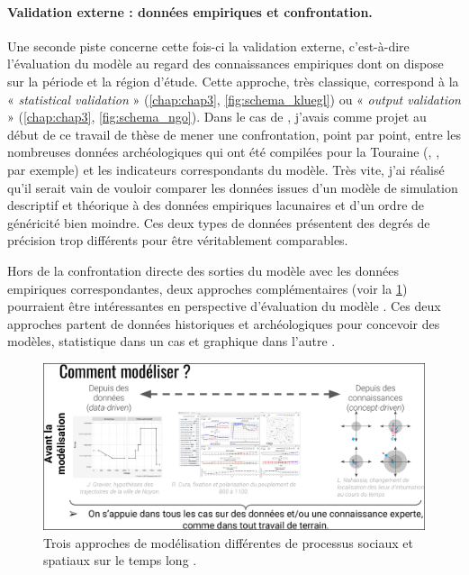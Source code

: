 \paragraph{Validation externe : données empiriques et confrontation.}
Une seconde piste concerne cette fois-ci la validation externe, c'est-à-dire l'évaluation du modèle au regard des connaissances empiriques dont on dispose sur la période et la région d'étude.
Cette approche, très classique, correspond à la « \textit{statistical validation} » (\cref{chap:chap3}, \cref{fig:schema_kluegl}) ou « \textit{output validation} » (\cref{chap:chap3}, \cref{fig:schema_ngo}).
Dans le cas de \simfeodal{}, j'avais comme projet au début de ce travail de thèse de mener une confrontation, point par point, entre les nombreuses données archéologiques qui ont été compilées pour la Touraine (\cite{rodier2000systeme}, \cite{zadora-rio_paroisses_2008}, par exemple) et les indicateurs correspondants du modèle.
Très vite, j'ai réalisé qu'il serait vain de vouloir comparer les données issues d'un modèle de simulation descriptif et théorique à des données empiriques lacunaires et d'un ordre de généricité bien moindre.
Ces deux types de données présentent des degrés de précision trop différents pour être véritablement comparables.

Hors de la confrontation directe des sorties du modèle avec les données empiriques correspondantes, deux approches complémentaires (voir la \cref{fig:JIG}) pourraient être intéressantes en perspective d'évaluation du modèle \simfeodal{}.
Ces deux approches partent de données historiques et archéologiques pour concevoir des modèles, statistique dans un cas \autocite{gravier_deux_2018} et graphique dans l'autre \autocite{nahassia_formes_2019}.

\begin{figure}[H]
	\centering
	\includegraphics[width=\linewidth]{img/types_modelisation_JIG.png}
	\caption[Trois approches de modélisation différentes de processus sociaux et spatiaux sur le temps long.]{Trois approches de modélisation différentes de processus sociaux et spatiaux sur le temps long \autocite{cura:halshs-02296147}.}
	\label{fig:JIG}
\end{figure}

